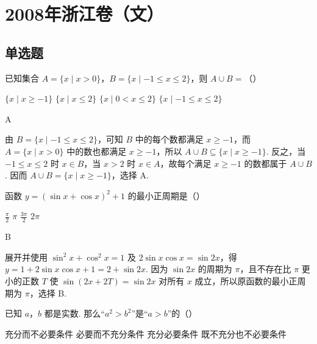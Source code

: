 \chapter{2008年浙江卷（文）}

\section{单选题}

\begin{problem}
已知集合 \(A = \{x \mid x > 0\}\)，\(B = \{x \mid -1 \leqslant x \leqslant 2\}\)，则 \(A \cup B =\)（\quad）

\choices
    {\( \{x \mid x \geqslant -1\} \)}
    {\(\{x\mid x\leqslant 2\}\)}
    {\( \{x \mid 0 < x \leqslant 2\} \)}
    {\(\{x\mid -1\leqslant x\leqslant 2\}\)}
\end{problem}

\begin{answer}
A
\end{answer}

\begin{solution}
由 \(B=\{x\mid -1\leqslant x\leqslant2\}\)，可知 \(B\) 中的每个数都满足 \(x\geqslant-1\)，而 \(A=\{x\mid x>0\}\) 中的数也都满足 \(x\geqslant-1\)，所以 \(A\cup B\subseteq\{x\mid x\geqslant-1\}\). 反之，当 \(-1\leqslant x\leqslant2\) 时 \(x\in B\)，当 \(x>2\) 时 \(x\in A\)，故每个满足 \(x\geqslant-1\) 的数都属于 \(A\cup B\). 因而 \(A\cup B=\{x\mid x\geqslant-1\}\)，选择 A.
\end{solution}

\begin{problem}
函数 \( y = (\sin x + \cos x)^2 + 1 \) 的最小正周期是（\quad）

\choices
    {\(\frac{\pi}{2}\)}
    {\(\pi\)}
    {\(\frac{3\pi}{2}\)}
    {\(2\pi\)}
\end{problem}

\begin{answer}
B
\end{answer}

\begin{solution}
展开并使用 \(\sin^2x+\cos^2x=1\) 及 \(2\sin x\cos x=\sin2x\)，得 \(y=1+2\sin x\cos x+1=2+\sin2x\). 因为 \(\sin2x\) 的周期为 \(\pi\)，且不存在比 \(\pi\) 更小的正数 \(T\) 使 \(\sin(2x+2T)=\sin2x\) 对所有 \(x\) 成立，所以原函数的最小正周期为 \(\pi\)，选择 B.
\end{solution}

\begin{problem}
已知 \(a\)，\(b\) 都是实数. 那么“\(a^2 > b^2\)”是“\(a > b\)”的（\quad）

\choices
    {充分而不必要条件}
    {必要而不充分条件}
    {充分必要条件}
    {既不充分也不必要条件}
\end{problem}

